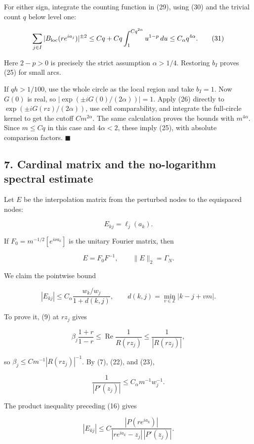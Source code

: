\documentclass[10pt,a4paper]{article}
\begin{document}
For either sign, integrate the counting function in (29), using (30) and
the trivial count \(q\) below level one:

\nopagebreak[4]
\[\sum_{j\in I}|B_{\rm loc}(re^{ia_j})|^{\pm2}
 \le Cq+Cq\int_1^{Cq^{2\alpha}}u^{1-p}\,du
 \le C_\alpha q^{4\alpha}. \tag{31}\]

Here \(2-p>0\) is precisely the strict assumption \(\alpha>1/4\).
Restoring \(b_I\) proves (25) for small arcs.

If \(qh>1/100\), use the whole circle as the local region and take
\(b_I=1\). Now \(G(0)\) is real, so \(|\exp(\pm iG(0)/(2\alpha))|=1\).
Apply (26) directly to \(\exp(\pm iG(rz)/(2\alpha))\), use cell
comparability, and integrate the full-circle kernel to get the cutoff
\(Cm^{2\alpha}\). The same calculation proves the bounds with
\(m^{4\alpha}\). Since \(m\le Cq\) in this case and \(4\alpha<2\), these
imply (25), with absolute comparison factors. \ensuremath{\blacksquare}

\subsection{7. Cardinal matrix and the no-logarithm spectral
estimate}\label{cardinal-matrix-and-the-no-logarithm-spectral-estimate}

Let \(E\) be the interpolation matrix from the perturbed nodes to the
equispaced nodes:

\nopagebreak[4]
\[E_{kj}=\ell_j(a_k).\]

If \(F_0=m^{-1/2}[e^{i\nu a_k}]\) is the unitary Fourier matrix, then

\nopagebreak[4]
\[E=F_0F^{-1},\qquad \|E\|_2=\Gamma_N. \tag{32}\]

We claim the pointwise bound

\nopagebreak[4]
\[|E_{kj}|\le C_\alpha\frac{w_k/w_j}{1+d(k,j)},\qquad
 d(k,j)=\min_{v\in\mathbb Z}|k-j+vm|. \tag{33}\]

To prove it, (9) at \(rz_j\) gives

\nopagebreak[4]
\[\beta_j\frac{1+r}{1-r}\le\operatorname{Re}\frac1{R(rz_j)}
 \le\frac1{|R(rz_j)|},\]

so \(\beta_j\le C m^{-1}|R(rz_j)|^{-1}\). By (7), (22), and (23),

\nopagebreak[4]
\[\frac1{|P'(z_j)|}\le C_\alpha m^{-1}w_j^{-1}.\]

The product inequality preceding (16) gives

\nopagebreak[4]
\[|E_{kj}|\le C\frac{|P(re^{ia_k})|}{|re^{ia_k}-z_j|\,|P'(z_j)|}.\]
\end{document}
